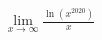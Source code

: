 \documentclass[13pt]{article}
\begin{document}
\par\noindent
\begin{fleqn}[4em]

\begin{align*}
\boxed{
\begin{aligned}
  & \lim_{x \to \infty} \frac{\ln(x^{2020})}{x} \\
\end{aligned}
}
\end{align*}


\end{fleqn}
\end{document}
